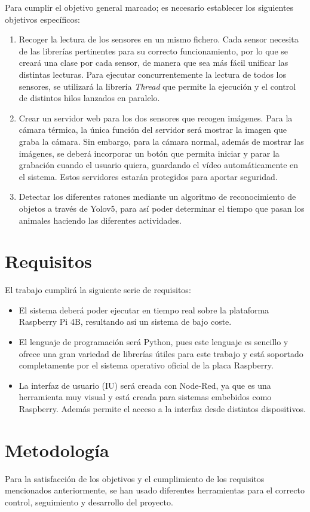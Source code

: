 Para cumplir el objetivo general marcado; es necesario establecer los siguientes objetivos específicos:
\begin{enumerate}
 \item Recoger la lectura de los sensores en un mismo fichero. Cada sensor necesita de las librerías pertinentes para su correcto funcionamiento, por lo que se creará una clase por cada sensor, de manera que sea más fácil unificar las distintas lecturas. Para ejecutar concurrentemente la lectura de todos los sensores, se utilizará la librería \textit{Thread} que permite la ejecución y el control de distintos hilos lanzados en paralelo.
 \item Crear un servidor web para los dos sensores que recogen imágenes. Para la cámara térmica, la única función del servidor será mostrar la imagen que graba la cámara. Sin embargo, para la cámara normal, además de mostrar las imágenes, se deberá incorporar un botón que permita iniciar y parar la grabación cuando el usuario quiera, guardando el vídeo automáticamente en el sistema. Estos servidores estarán protegidos para aportar seguridad.
 \item Detectar los diferentes ratones mediante un algoritmo de reconocimiento de objetos a través de Yolov5, para así poder determinar el tiempo que pasan los animales haciendo las diferentes actividades.
\end{enumerate}

\section{Requisitos}
\label{sec:requisitos}
El trabajo cumplirá la siguiente serie de requisitos:
\begin{itemize}
 \item El sistema deberá poder ejecutar en tiempo real sobre la plataforma Raspberry Pi 4B, resultando así un sistema de bajo coste.
 \item El lenguaje de programación será Python, pues este lenguaje es sencillo y ofrece una gran variedad de librerías útiles para este trabajo y está soportado completamente por el sistema operativo oficial de la placa Raspberry.
 \item La interfaz de usuario (IU) será creada con Node-Red, ya que es una herramienta muy visual y está creada para sistemas embebidos como Raspberry. Además permite el acceso a la interfaz desde distintos dispositivos.
\end{itemize}

\section{Metodología}
\label{sec:metodologia}
Para la satisfacción de los objetivos y el cumplimiento de los requisitos mencionados anteriormente, se han usado diferentes herramientas para el correcto control, seguimiento y desarrollo del proyecto.\\

